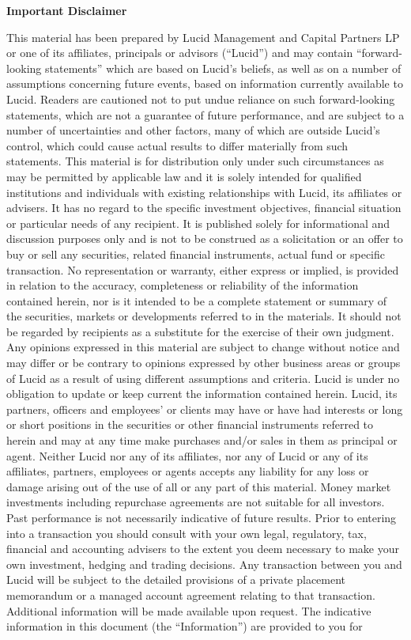\documentclass[9pt]{article}
\begin{document}
\noindent\textbf{\color{lucid_blue}Important Disclaimer}

\scriptsize

\noindent This material has been prepared by Lucid Management and Capital Partners LP or one of its affiliates, principals or advisors (``Lucid'') and may contain ``forward-looking statements'' which are based on Lucid's beliefs, as well as on a number of assumptions concerning future events, based on information currently available to Lucid. Readers are cautioned not to put undue reliance on such forward-looking statements, which are not a guarantee of future performance, and are subject to a number of uncertainties and other factors, many of which are outside Lucid's control, which could cause actual results to differ materially from such statements. This material is for distribution only under such circumstances as may be permitted by applicable law and it is solely intended for qualified institutions and individuals with existing relationships with Lucid, its affiliates or advisers.  It has no regard to the specific investment objectives, financial situation or particular needs of any recipient. It is published solely for informational and discussion purposes only and is not to be construed as a solicitation or an offer to buy or sell any securities, related financial instruments, actual fund or specific transaction. No representation or warranty, either express or implied, is provided in relation to the accuracy, completeness or reliability of the information contained herein, nor is it intended to be a complete statement or summary of the securities, markets or developments referred to in the materials.  It should not be regarded by recipients as a substitute for the exercise of their own judgment. Any opinions expressed in this material are subject to change without notice and may differ or be contrary to opinions expressed by other business areas or groups of Lucid as a result of using different assumptions and criteria. Lucid is under no obligation to update or keep current the information contained herein. Lucid, its partners, officers and employees' or clients may have or have had interests or long or short positions in the securities or other financial instruments referred to herein and may at any time make purchases and/or sales in them as principal or agent. Neither Lucid nor any of its affiliates, nor any of Lucid or any of its affiliates, partners, employees or agents accepts any liability for any loss or damage arising out of the use of all or any part of this material. Money market investments including repurchase agreements are not suitable for all investors. Past performance is not necessarily indicative of future results.  Prior to entering into a transaction you should consult with your own legal, regulatory, tax, financial and accounting advisers to the extent you deem necessary to make your own investment, hedging and trading decisions. Any transaction between you and Lucid will be subject to the detailed provisions of a private placement memorandum or a managed account agreement relating to that transaction. Additional information will be made available upon request. The indicative information in this document (the ``Information'') are provided to you for 
\end{document}
